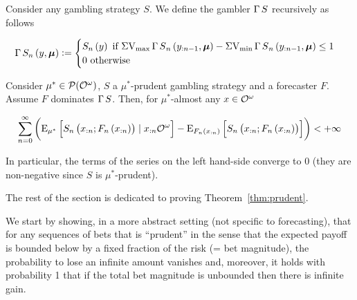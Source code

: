 \begin{definition}

Consider any gambling strategy $S$. We define the gambler $\operatorname{\Gamma}{S}$ recursively as follows

\begin{equation}
\operatorname{\Gamma}{S}_n\left(y,\bm{\mu}\right):=\begin{cases} S_n\left(y\right) \text{ if } {\operatorname{\Sigma V_{\max}}{\operatorname{\Gamma}{S}}_n\left(y_{:n-1},\bm{\mu}\right)}-{\operatorname{\Sigma V_{\min}}{\operatorname{\Gamma}{S}}_n\left(y_{:n-1},\bm{\mu}\right)} \leq 1 \\ 0 \text{ otherwise} \end{cases}
\end{equation}

\end{definition}

\begin{theorem}
\label{thm:prudent}

Consider $\mu^* \in \mathcal{P}(\mathcal{O}^\omega)$, $S$ a $\mu^*$-prudent gambling strategy and a forecaster $F$. Assume $F$ dominates $\operatorname{\Gamma}{S}$. Then, for $\mu^*$-almost any $x \in \mathcal{O}^\omega$

\begin{equation}
\label{eqn:thm_prudent}
\sum_{n=0}^\infty \left(\operatorname{E}_{\mu^*}\left[S_n\left(x_{:n};F_n\left(x_{:n}\right)\right) \mid x_{:n}\mathcal{O}^\omega\right]-\operatorname{E}_{F_n\left(x_{:n}\right)}\left[S_n\left(x_{:n};F_n\left(x_{:n}\right)\right)\right]\right) < +\infty
\end{equation}

\end{theorem}

In particular, the terms of the series on the left hand-side converge to 0 (they are non-negative since $S$ is $\mu^*$-prudent).

The rest of the section is dedicated to proving Theorem~\ref{thm:prudent}.

We start by showing, in a more abstract setting (not specific to forecasting), that for any sequences of bets that is \enquote{prudent} in the sense that the expected payoff is bounded below by a fixed fraction of the risk (= bet magnitude), the probability to lose an infinite amount vanishes and, moreover, it holds with probability 1 that if the total bet magnitude is unbounded then there is infinite gain.

